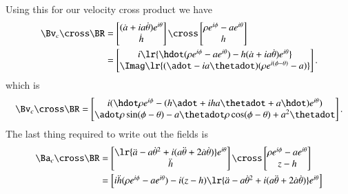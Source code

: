 {Using this for our velocity cross product we have
%
\begin{equation}\label{eqn:relativisticElectrodynamicsExamReflection:1310}
\begin{aligned}
\Bv_c \cross \BR
&=
\begin{bmatrix}
(\dot{a} + i a \dot{\theta}) e^{i\theta} \\
\dot{h}
\end{bmatrix}
\cross
\begin{bmatrix}
\rho e^{i\phi} - a e^{i\theta} \\
h
\end{bmatrix} \\
&=
\begin{bmatrix}
i
\lr{
   \hdot ( \rho e^{i\phi} - a e^{i\theta} ) - h (\dot{a} + i a \dot{\theta}) e^{i\theta} 
}
\\
\Imag 
\lr{
   ( \adot - i a \thetadot) (\rho e^{i(\phi - \theta)} - a) 
}
\end{bmatrix}.
\end{aligned}
\end{equation}
%
which is
%
\begin{equation}\label{eqn:relativisticElectrodynamicsExamReflection:970}
\Bv_c \cross \BR
=
\begin{bmatrix}
i( \hdot \rho e^{i\phi} - (h \adot + i h a \thetadot + a \hdot) e^{i\theta} ) \\
\adot \rho \sin(\phi - \theta) - a \thetadot \rho \cos(\phi - \theta) + a^2 \thetadot
\end{bmatrix}.
\end{equation}
%
The last thing required to write out the fields is
%
\begin{equation}\label{eqn:relativisticElectrodynamicsExamReflection:1330}
\begin{aligned}
\Ba_c \cross \BR
&=
\begin{bmatrix}
\lr{
   \ddot{a} - a {\dot{\theta}}^2 + i ( a\ddot{\theta} + 2 \dot{a} \dot{\theta} ) 
}
e^{i\theta} \\
\ddot{h}
\end{bmatrix}
\cross
\begin{bmatrix}
\rho e^{i\phi} - a e^{i\theta} \\
z - h
\end{bmatrix} \\
&=
\begin{bmatrix}
i \ddot{h} (\rho e^{i\phi} - a e^{i\theta} ) - i (z - h) 
\lr{
   \ddot{a} - a {\dot{\theta}}^2 + i ( a\ddot{\theta} + 2 \dot{a} \dot{\theta} ) 
}
e^{i\theta} \\

\end{bmatrix}
\end{aligned}
\end{equation}}
